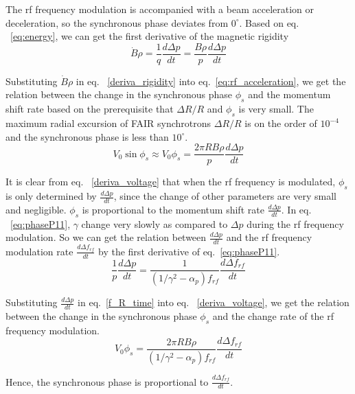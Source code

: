 \begin{itemize}
The rf frequency modulation is accompanied with a beam acceleration or deceleration, so the synchronous phase deviates from $0^\circ$. Based on eq. ~\ref{eq:energy}, we can get the first derivative of the magnetic rigidity
\begin{equation}
	\label{deriva_rigidity}
	\dot{B}\rho =\frac{1}{q}\frac{d \Delta p}{dt}=\frac{B\rho}{p}\frac{d \Delta p}{dt}
\end{equation}

Substituting $\dot{B}\rho$ in eq. ~\ref{deriva_rigidity} into eq.~\ref{eq:rf_acceleration}, we get the relation between the change in the synchronous phase $\phi_{s}$ and the momentum shift rate based on the prerequisite that $\Delta R/R$ and $\phi_s$ is very small. The maximum radial excursion of FAIR synchrotrons $\Delta R/R$ is on the order of $10^{-4}$ and the synchronous phase is less than $10^\circ$.
\begin{equation}
\label{deriva_voltage}
V_0\sin\phi_s\approx V_0\phi_s=\frac{2\pi R B\rho}{p} \frac{d \Delta p}{dt}
\end{equation} 

It is clear from eq. ~\ref{deriva_voltage} that when the rf frequency is modulated, $\phi_s$ is only determined by $\frac{d \Delta p}{dt}$, since the change of other parameters are very small and negligible. $\phi_s$ is proportional to the momentum shift rate $\frac{d \Delta p}{dt}$. In eq. ~\ref{eq:phaseP11}, $\gamma$ change very slowly as compared to $\Delta p$ during the rf frequency modulation. So we can get the relation between $\frac{d \Delta p}{dt}$ and the rf frequency modulation rate $\frac{d \Delta f_\mathit{rf}}{dt}$ by the first derivative of eq.~\ref{eq:phaseP11}. 
\begin{equation}
\label{f_R_time}
\frac{1}{p}\frac{d \Delta p}{dt}=\frac{1}{(1/\gamma^2-\alpha_p)f_\mathit{rf}}\frac{d \Delta f_\mathit{rf}}{dt}
\end{equation} 

Substituting $\frac{d \Delta p}{dt}$ in eq.~\ref{f_R_time} into eq. ~\ref{deriva_voltage}, we get the relation between the change in the synchronous phase $\phi_{s}$ and the change rate of the rf frequency modulation.
\begin{equation}
V_0\phi_s=\frac{2\pi R B\rho}{(1/\gamma^2-\alpha_p)f_\mathit{rf}} \frac{d \Delta f_\mathit{rf}}{dt}
\end{equation} 

Hence, the synchronous phase is proportional to $\frac{d \Delta f_\mathit{rf}}{dt}$. 
%


\end{itemize}
